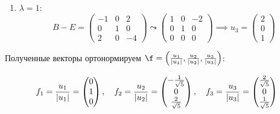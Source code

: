 \begin{enumerate}
    \item $\lambda = 1:$
          \[
              B - E =
              \begin{pmatrix}
                  -1 & 0 & 2  \\
                  0  & 1 & 0  \\
                  2  & 0 & -4
              \end{pmatrix}
              \leadsto
              \begin{pmatrix}
                  1 & 0 & -2 \\
                  0 & 1 & 0  \\
                  0 & 0 & 0
              \end{pmatrix}
              \implies
              u_3 =
              \begin{pmatrix}
                  2 \\
                  0 \\
                  1
              \end{pmatrix}
          \]
\end{enumerate}

Полученные векторы ортонормируем $\f = \l( \d{u_1}{|u_1|}, \d{u_2}{|u_2|}, \d{u_3}{|u_3|} \r)$:

\newpage

\[
    f_1 = \frac{u_1}{|u_1|} =
    \begin{pmatrix}
        0 \\
        1 \\
        0
    \end{pmatrix},
    \quad
    f_2 = \frac{u_2}{|u_2|} =
    \begin{pmatrix}
        -\frac{1}{\sqrt{5}} \\
        0                \\
        \frac{2}{\sqrt{5}}
    \end{pmatrix},
    \quad
    f_3 = \frac{u_3}{|u_3|} =
    \begin{pmatrix}
        \frac{2}{\sqrt{5}} \\
        0               \\
        \frac{1}{\sqrt{5}}
    \end{pmatrix}
\]

